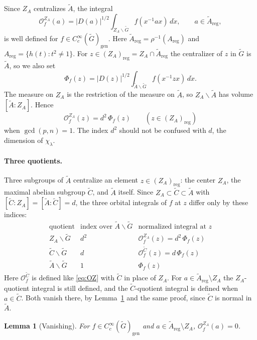 \documentclass[12pt,letterpaper]{article}
\numberwithin{equation}{section}
\theoremstyle{plain}
\newtheorem{lemma}[theorem]{Lemma}
\theoremstyle{definition}
\theoremstyle{remark}
\newcommand{\Gt}{\widetilde G}
\newcommand{\At}{\widetilde A}
\newcommand{\Ct}{\widetilde C}
\newcommand{\ZA}{Z_A}
\newcommand{\gen}{\mathrm{gen}}
\newcommand{\reg}{\mathrm{reg}}
\begin{document}
Since $\ZA$ centralizes $\At$, the integral
\begin{equation}\label{eq:OZ}
\mathcal O_f^{\ZA}(a)=|D(a)|^{1/2}\int_{\ZA\backslash\Gt}
f(x^{-1}ax)\,d\dot x,\qquad a\in\At_\reg,
\end{equation}
is well defined for $f\in C_c^\infty(\Gt)_\gen$. Here
$\At_\reg=\rho^{-1}(A_\reg)$ and $A_\reg=\{h(t):t^2\ne1\}$. For
$z\in(\ZA)_\reg=\ZA\cap\At_\reg$ the centralizer of $z$ in $\Gt$ is
$\At$, so we also set
\begin{equation}\label{eq:Phi}
\Phi_f(z)=|D(z)|^{1/2}\int_{\At\backslash\Gt}f(x^{-1}zx)\,d\dot x .
\end{equation}
The measure on $\ZA$ is the restriction of the measure on $\At$, so
$\ZA\backslash\At$ has volume $[\At:\ZA]$. Hence
\begin{equation}\label{eq:index-phi}
\mathcal O_f^{\ZA}(z)=d^2\,\Phi_f(z)\qquad(z\in(\ZA)_\reg)
\end{equation}
when $\gcd(p,n)=1$. The index $d^2$ should not be confused with $d$,
the dimension of $\chi_\lambda$.

\paragraph{Three quotients.} Three subgroups of $\At$ centralize an
element $z\in(\ZA)_\reg$: the center $\ZA$, the maximal abelian subgroup
$\Ct$, and $\At$ itself. Since $\ZA\subset\Ct\subset\At$ with
$[\Ct:\ZA]=[\At:\Ct]=d$, the three orbital integrals of $f$ at $z$
differ only by these indices:
\begin{equation}\label{eq:three-quotients}
\begin{array}{lll}
\text{quotient} & \text{index over }\At\backslash\Gt & \text{normalized integral at }z\\[2pt]
\ZA\backslash\Gt & d^2 & \mathcal O_f^{\ZA}(z)=d^2\,\Phi_f(z)\\
\Ct\backslash\Gt & d & \mathcal O_f^{\Ct}(z)=d\,\Phi_f(z)\\
\At\backslash\Gt & 1 & \Phi_f(z)
\end{array}
\end{equation}
Here $\mathcal O_f^{\Ct}$ is defined like \eqref{eq:OZ} with $\Ct$ in
place of $\ZA$. For $a\in\At_\reg\setminus\ZA$ the $\ZA$-quotient
integral is still defined, and the $\Ct$-quotient integral is defined
when $a\in\Ct$. Both vanish there, by Lemma~\ref{lem:vanishing} and the
same proof, since $\Ct$ is normal in $\At$.

\begin{lemma}[Vanishing]\label{lem:vanishing}
For $f\in C_c^\infty(\Gt)_\gen$ and $a\in\At_\reg\setminus\ZA$,
$\mathcal O_f^{\ZA}(a)=0$.
\end{lemma}
\end{document}
